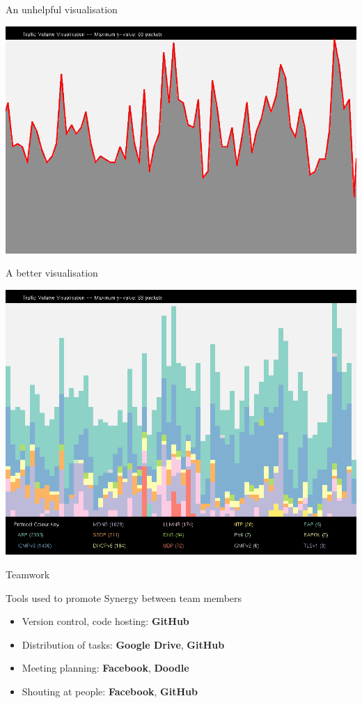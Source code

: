 \documentclass{beamer}
\begin{document}
    \begin{frame}{An unhelpful visualisation}

        \includegraphics[width=\textwidth,keepaspectratio]{img/ex0.png}

    \end{frame}

    \begin{frame}{A better visualisation}

        \includegraphics[width=\textwidth,keepaspectratio]{img/ex1.png}

    \end{frame}

    \begin{frame}{Teamwork}

        Tools used to promote Synergy\small{\texttrademark} between team members
        \begin{itemize}
            \item{Version control, code hosting: \textbf{GitHub}}
            \item{Distribution of tasks: \textbf{Google Drive}, \textbf{GitHub}}
            \item{Meeting planning: \textbf{Facebook}, \textbf{Doodle}}
            \item{Shouting at people: \textbf{Facebook}, \textbf{GitHub}}
        \end{itemize}

    \end{frame} 
\end{document}

